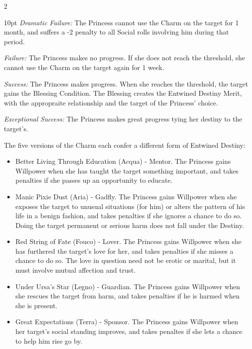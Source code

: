 \begin{multicols}{2}
       \begin{myindentpar}{10pt}  \emph{Dramatic Failure:} The Princess cannot use the Charm on the target for 1 month, and suffers a -2 penalty to all Social rolls involving him during that period.

        \emph{Failure:} The Princess makes no progress. If she does not reach the threshold, she cannot use the Charm on the target again for 1 week.

        \emph{Success:} The Princess makes progress. When she reaches the threshold, the target gains the Blessing Condition. The Blessing creates the Entwined Destiny Merit, with the appropraite relationship and the target of the Princess' choice. 

        \emph{Exceptional Success:} The Princess makes great progress tying her destiny to the target's.\end{myindentpar}

\noindent The five versions of the Charm each confer a different form of Entwined Destiny:
\begin{itemize}
\item    Better Living Through Education (Acqua) - Mentor. The Princess gains Willpower when she has taught the target something important, and takes penalties if she passes up an opportunity to educate.

\item    Manic Pixie Dust (Aria) - Gadfly. The Princess gains Willpower when she exposes the target to unusual situations (for him) or alters the pattern of his life in a benign fashion, and takes penalties if she ignores a chance to do so. Doing the target permanent or serious harm does not fall under the Destiny.

\item    Red String of Fate (Fouco) - Lover. The Princess gains Willpower when she has furthered the target's love for her, and takes penalties if she misses a chance to do so. The love in question need not be erotic or marital, but it must involve mutual affection and trust.

\item    Under Ursa's Star (Legno) - Guardian. The Princess gains Willpower when she rescues the target from harm, and takes penalties if he is harmed when she is present.

\item    Great Expectations (Terra) - Sponsor. The Princess gains Willpower when her target's social standing improves, and takes penaltes if she lets a chance to help him rise go by. 
 \end{itemize}


\end{multicols}

